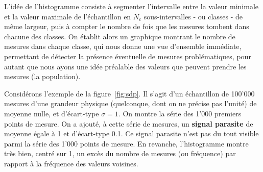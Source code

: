 \documentclass[main.tex]{subfiles}
\begin{document}
L'idée de l'histogramme consiste à segmenter l'intervalle entre la valeur minimale et la valeur maximale de l'échantillon en $N_c$ sous-intervalles - ou classes - de même largeur, puis à compter le nombre de fois que les mesures tombent dans chacune des classes. On établit alors un graphique montrant le nombre de mesures dans chaque classe, qui nous donne une vue d'ensemble immédiate, permettant de détecter la présence éventuelle de mesures problématiques, pour autant que nous ayons une idée préalable des valeurs que peuvent prendre les mesures (la population).

Considérons l'exemple de la figure~\ref{fig:sdp}. Il s'agit d'un échantillon de 100'000 mesures d'une grandeur physique (quelconque, dont on ne précise pas l'unité) de moyenne nulle, et d'écart-type $\sigma=1$. On montre la série des 1'000 premiers points de mesure. On a ajouté, à cette série de mesures, un \textbf{signal parasite} de moyenne égale à 1 et d'écart-type 0.1. Ce signal parasite n'est pas du tout visible parmi la série des 1'000 points de mesure. En revanche, l'histogramme montre très bien, centré sur 1, un excès du nombre de mesures (ou fréquence) par rapport à la fréquence des valeurs voisines.
\end{document}
